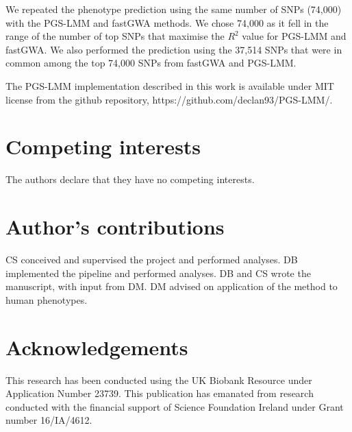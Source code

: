 \documentclass[doublespacing]{bmcart}
\begin{document}
We repeated the phenotype prediction using the same number of SNPs (74,000) with the PGS-LMM and fastGWA methods. We chose 74,000 as it fell in the range of the number of top SNPs that maximise the $R^2$ value for PGS-LMM and fastGWA. We also performed the prediction using the 37,514 SNPs that were in common among the top 74,000 SNPs from fastGWA and PGS-LMM.





\begin{backmatter}
The PGS-LMM implementation described in this work is available under MIT license from the github repository, https://github.com/declan93/PGS-LMM/.
\section*{Competing interests}
  The authors declare that they have no competing interests.

\section*{Author's contributions}
CS conceived and supervised the project and performed analyses. DB implemented the pipeline and performed analyses. DB and CS wrote the manuscript, with input from DM. DM advised on application of the method to human phenotypes.
\section*{Acknowledgements}
This research has been conducted using the UK Biobank Resource under Application Number 23739. This publication has emanated from research conducted with the financial support of Science Foundation Ireland under Grant number 16/IA/4612.



\end{backmatter}
\end{document}
